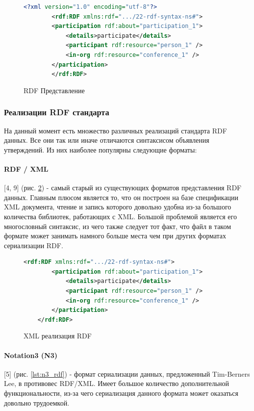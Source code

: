 \documentclass[12pt]{article}
\begin{document}
\pagebreak

\begin{figure}
    \begin{lstlisting}[language=XML]
        <?xml version="1.0" encoding="utf-8"?>
        <rdf:RDF xmlns:rdf=".../22-rdf-syntax-ns#">
        <participation rdf:about="participation_1">
            <details>participate</details>
            <participant rdf:resource="person_1" />
            <in-org rdf:resource="conference_1" />
        </participation>
        </rdf:RDF>
    \end{lstlisting}
    \caption{RDF Представление}
    \label{lst:eric}
\end{figure}

\subsubsection{Реализации RDF стандарта}
\qquad На данный момент есть множество различных реализаций стандарта RDF данных. Все они так или иначе отличаются синтаксисом объявления утверждений. Из них наиболее популярны следующие форматы:\par

\paragraph{RDF / XML} [4, 9] (рис. \ref{lst:xml_rdf}) - самый старый из существующих форматов представления RDF данных. Главным плюсом является то, что он построен на базе спецификации XML документа, чтение и запись которого довольно удобна из-за большого количества библиотек, работающих с XML. Большой проблемой является его многословный синтаксис, из чего также следует тот факт, что файл в таком формате может занимать намного больше места чем при других форматах сериализации RDF.\par

\begin{figure}[!ht]
    \begin{lstlisting}[language=XML]
    <rdf:RDF xmlns:rdf=".../22-rdf-syntax-ns#"> 
        <participation rdf:about="participation_1">
            <details>participate</details>
            <participant rdf:resource="person_1" />
            <in-org rdf:resource="conference_1" />
        </participation>
    </rdf:RDF>
    \end{lstlisting}
    \caption{XML реализация RDF}
    \label{lst:xml_rdf}
\end{figure}

\paragraph{Notation3 (N3)} [5] (рис. \ref{lst:n3_rdf}) - формат сериализации данных, предложенный Tim-Berners Lee, в противовес RDF/XML. Имеет большое количество дополнительной функциональности, из-за чего сериализация данного формата может оказаться довольно трудоемкой.
\end{document}

